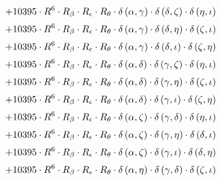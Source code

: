 \begin{subequations}
\begin{gather}
 \\[0.2em] \notag 		 + 10395 \cdot R^{6} \cdot R_{\beta{}} \cdot R_{\epsilon{}} \cdot R_{\theta{}} \cdot \delta{}\left(\alpha{}, \gamma{}\right) \cdot \delta{}\left(\delta{}, \zeta{}\right) \cdot \delta{}\left(\eta{}, \iota{}\right) 
 \\[0.2em] \notag 		 + 10395 \cdot R^{6} \cdot R_{\beta{}} \cdot R_{\epsilon{}} \cdot R_{\theta{}} \cdot \delta{}\left(\alpha{}, \gamma{}\right) \cdot \delta{}\left(\delta{}, \eta{}\right) \cdot \delta{}\left(\zeta{}, \iota{}\right) 
 \\[0.2em] \notag 		 + 10395 \cdot R^{6} \cdot R_{\beta{}} \cdot R_{\epsilon{}} \cdot R_{\theta{}} \cdot \delta{}\left(\alpha{}, \gamma{}\right) \cdot \delta{}\left(\delta{}, \iota{}\right) \cdot \delta{}\left(\zeta{}, \eta{}\right) 
 \\[0.2em] \notag 		 + 10395 \cdot R^{6} \cdot R_{\beta{}} \cdot R_{\epsilon{}} \cdot R_{\theta{}} \cdot \delta{}\left(\alpha{}, \delta{}\right) \cdot \delta{}\left(\gamma{}, \zeta{}\right) \cdot \delta{}\left(\eta{}, \iota{}\right) 
 \\[0.2em] \notag 		 + 10395 \cdot R^{6} \cdot R_{\beta{}} \cdot R_{\epsilon{}} \cdot R_{\theta{}} \cdot \delta{}\left(\alpha{}, \delta{}\right) \cdot \delta{}\left(\gamma{}, \eta{}\right) \cdot \delta{}\left(\zeta{}, \iota{}\right) 
 \\[0.2em] \notag 		 + 10395 \cdot R^{6} \cdot R_{\beta{}} \cdot R_{\epsilon{}} \cdot R_{\theta{}} \cdot \delta{}\left(\alpha{}, \delta{}\right) \cdot \delta{}\left(\gamma{}, \iota{}\right) \cdot \delta{}\left(\zeta{}, \eta{}\right) 
 \\[0.2em] \notag 		 + 10395 \cdot R^{6} \cdot R_{\beta{}} \cdot R_{\epsilon{}} \cdot R_{\theta{}} \cdot \delta{}\left(\alpha{}, \zeta{}\right) \cdot \delta{}\left(\gamma{}, \delta{}\right) \cdot \delta{}\left(\eta{}, \iota{}\right) 
 \\[0.2em] \notag 		 + 10395 \cdot R^{6} \cdot R_{\beta{}} \cdot R_{\epsilon{}} \cdot R_{\theta{}} \cdot \delta{}\left(\alpha{}, \zeta{}\right) \cdot \delta{}\left(\gamma{}, \eta{}\right) \cdot \delta{}\left(\delta{}, \iota{}\right) 
 \\[0.2em] \notag 		 + 10395 \cdot R^{6} \cdot R_{\beta{}} \cdot R_{\epsilon{}} \cdot R_{\theta{}} \cdot \delta{}\left(\alpha{}, \zeta{}\right) \cdot \delta{}\left(\gamma{}, \iota{}\right) \cdot \delta{}\left(\delta{}, \eta{}\right) 
 \\[0.2em] \notag 		 + 10395 \cdot R^{6} \cdot R_{\beta{}} \cdot R_{\epsilon{}} \cdot R_{\theta{}} \cdot \delta{}\left(\alpha{}, \eta{}\right) \cdot \delta{}\left(\gamma{}, \delta{}\right) \cdot \delta{}\left(\zeta{}, \iota{}\right) 

\end{gather}
\end{subequations}
